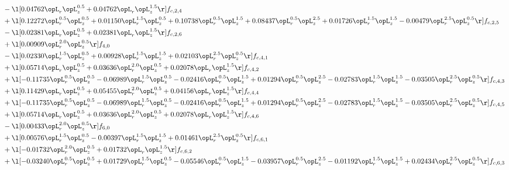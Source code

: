 \begin{alignat}{2}
& - \l[  0.04762 \opL_r \opL_z^{0.5} +  0.04762 \opL_r \opL_z^{1.5}  \r] f_{c,2,4} \nonumber \\ 
& + \l[  0.12272 \opL_r^{0.5} \opL_z^{0.5} +  0.01150 \opL_r^{1.5} \opL_z^{0.5} +  0.10738 \opL_r^{0.5} \opL_z^{1.5} +  0.08437 \opL_r^{0.5} \opL_z^{2.5} +  0.01726 \opL_r^{1.5} \opL_z^{1.5}   -0.00479 \opL_r^{2.5} \opL_z^{0.5}  \r] f_{c,2,5} \nonumber \\ 
& - \l[  0.02381 \opL_r \opL_z^{0.5} +  0.02381 \opL_r \opL_z^{1.5}  \r] f_{c,2,6} \nonumber \\ 
& + \l[  0.00909 \opL_r^{2.0} \opL_z^{0.5}  \r] f_{4,0} \nonumber \\ 
& - \l[  0.02330 \opL_r^{1.5} \opL_z^{0.5} +  0.00928 \opL_r^{1.5} \opL_z^{1.5} +  0.02103 \opL_r^{2.5} \opL_z^{0.5}  \r] f_{c,4,1} \nonumber \\ 
& + \l[  0.05714 \opL_r \opL_z^{0.5} +  0.03636 \opL_r^{2.0} \opL_z^{0.5} +  0.02078 \opL_r \opL_z^{1.5}  \r] f_{c,4,2} \nonumber \\ 
& + \l[  -0.11735 \opL_r^{0.5} \opL_z^{0.5}   -0.06989 \opL_r^{1.5} \opL_z^{0.5}   -0.02416 \opL_r^{0.5} \opL_z^{1.5} +  0.01294 \opL_r^{0.5} \opL_z^{2.5}   -0.02783 \opL_r^{1.5} \opL_z^{1.5}   -0.03505 \opL_r^{2.5} \opL_z^{0.5}  \r] f_{c,4,3} \nonumber \\ 
& + \l[  0.11429 \opL_r \opL_z^{0.5} +  0.05455 \opL_r^{2.0} \opL_z^{0.5} +  0.04156 \opL_r \opL_z^{1.5}  \r] f_{c,4,4} \nonumber \\ 
& + \l[  -0.11735 \opL_r^{0.5} \opL_z^{0.5}   -0.06989 \opL_r^{1.5} \opL_z^{0.5}   -0.02416 \opL_r^{0.5} \opL_z^{1.5} +  0.01294 \opL_r^{0.5} \opL_z^{2.5}   -0.02783 \opL_r^{1.5} \opL_z^{1.5}   -0.03505 \opL_r^{2.5} \opL_z^{0.5}  \r] f_{c,4,5} \nonumber \\ 
& + \l[  0.05714 \opL_r \opL_z^{0.5} +  0.03636 \opL_r^{2.0} \opL_z^{0.5} +  0.02078 \opL_r \opL_z^{1.5}  \r] f_{c,4,6} \nonumber \\ 
& - \l[  0.00433 \opL_r^{2.0} \opL_z^{0.5}  \r] f_{6,0} \nonumber \\ 
& + \l[  0.00576 \opL_r^{1.5} \opL_z^{0.5}   -0.00397 \opL_r^{1.5} \opL_z^{1.5} +  0.01461 \opL_r^{2.5} \opL_z^{0.5}  \r] f_{c,6,1} \nonumber \\ 
& + \l[  -0.01732 \opL_r^{2.0} \opL_z^{0.5} +  0.01732 \opL_r \opL_z^{1.5}  \r] f_{c,6,2} \nonumber \\ 
& + \l[  -0.03240 \opL_r^{0.5} \opL_z^{0.5} +  0.01729 \opL_r^{1.5} \opL_z^{0.5}   -0.05546 \opL_r^{0.5} \opL_z^{1.5}   -0.03957 \opL_r^{0.5} \opL_z^{2.5}   -0.01192 \opL_r^{1.5} \opL_z^{1.5} +  0.02434 \opL_r^{2.5} \opL_z^{0.5}  \r] f_{c,6,3} \nonumber \\ 

\end{alignat}
